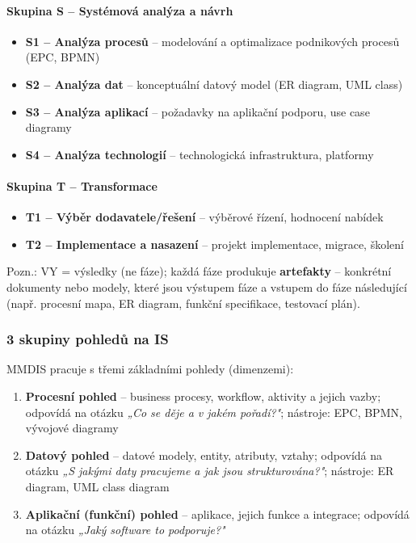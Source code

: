 \paragraph{Skupina S -- Systémová analýza a návrh}
\begin{itemize}
  \item \textbf{S1 -- Analýza procesů} -- modelování a optimalizace podnikových procesů (EPC, BPMN)
  \item \textbf{S2 -- Analýza dat} -- konceptuální datový model (ER diagram, UML class)
  \item \textbf{S3 -- Analýza aplikací} -- požadavky na aplikační podporu, use case diagramy
  \item \textbf{S4 -- Analýza technologií} -- technologická infrastruktura, platformy
\end{itemize}

\paragraph{Skupina T -- Transformace}
\begin{itemize}
  \item \textbf{T1 -- Výběr dodavatele/řešení} -- výběrové řízení, hodnocení nabídek
  \item \textbf{T2 -- Implementace a nasazení} -- projekt implementace, migrace, školení
\end{itemize}

Pozn.: VY = výsledky (ne fáze); každá fáze produkuje \textbf{artefakty} -- konkrétní dokumenty nebo modely, které jsou výstupem fáze a vstupem do fáze následující (např. procesní mapa, ER diagram, funkční specifikace, testovací plán).

\subsubsection{3 skupiny pohledů na IS}

MMDIS pracuje s třemi základními pohledy (dimenzemi):
\begin{enumerate}
  \item \textbf{Procesní pohled} -- business procesy, workflow, aktivity a jejich vazby;
    odpovídá na otázku \textit{„Co se děje a v jakém pořadí?"};
    nástroje: EPC, BPMN, vývojové diagramy
  \item \textbf{Datový pohled} -- datové modely, entity, atributy, vztahy;
    odpovídá na otázku \textit{„S jakými daty pracujeme a jak jsou strukturována?"};
    nástroje: ER diagram, UML class diagram
  \item \textbf{Aplikační (funkční) pohled} -- aplikace, jejich funkce a integrace;
    odpovídá na otázku \textit{„Jaký software to podporuje?"}
\end{enumerate}

